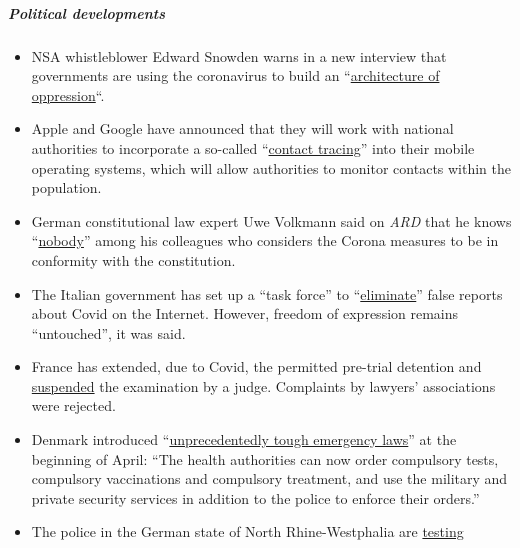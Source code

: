 \hypertarget{political-developments-1}{%
\subparagraph{\texorpdfstring{\textbf{Political
developments}}{Political developments}}\label{political-developments-1}}

\begin{itemize}
\tightlist
\item
  NSA whistleblower Edward Snowden warns in a new interview that
  governments are using the coronavirus to build an
  ``\href{https://www.vice.com/en_us/article/bvge5q/snowden-warns-governments-are-using-coronavirus-to-build-the-architecture-of-oppression}{architecture
  of oppression}``.
\item
  Apple and Google have announced that they will work with national
  authorities to incorporate a so-called
  ``\href{https://www.bloomberg.com/news/articles/2020-04-10/apple-google-bring-covid-19-contact-tracing-to-3-billion-people}{contact
  tracing}'' into their mobile operating systems, which will allow
  authorities to monitor contacts within the population.
\item
  German constitutional law expert Uwe Volkmann said on \emph{ARD} that
  he knows
  ``\href{https://www.youtube.com/watch?v=DvzrGLvzllU}{nobody}'' among
  his colleagues who considers the Corona measures to be in conformity
  with the constitution.
\item
  The Italian government has set up a ``task force'' to
  ``\href{https://www.faz.net/aktuell/feuilleton/medien/corona-in-italien-das-virus-und-die-wahrheit-16714529.html}{eliminate}''
  false reports about Covid on the Internet. However, freedom of
  expression remains ``untouched'', it was said.
\item
  France has extended, due to Covid, the permitted pre-trial detention
  and
  \href{https://www.lefigaro.fr/politique/coronavirus-le-conseil-d-etat-sur-la-ligne-de-crete-des-libertes-publiques-20200406}{suspended}
  the examination by a judge. Complaints by lawyers' associations were
  rejected.
\item
  Denmark introduced
  ``\href{https://www.fr.de/politik/coronavirus-sars-cov-2-daenemark-notfalls-militaer-13598503.html}{unprecedentedly
  tough emergency laws}'' at the beginning of April: ``The health
  authorities can now order compulsory tests, compulsory vaccinations
  and compulsory treatment, and use the military and private security
  services in addition to the police to enforce their orders.''
\item
  The police in the German state of North Rhine-Westphalia are
  \href{https://rp-online.de/nrw/panorama/nrw-polizei-testet-drohnen-bei-einsaetzen-wegen-corona-massnahmen_aid-50006143}{testing
}
\end{itemize}
